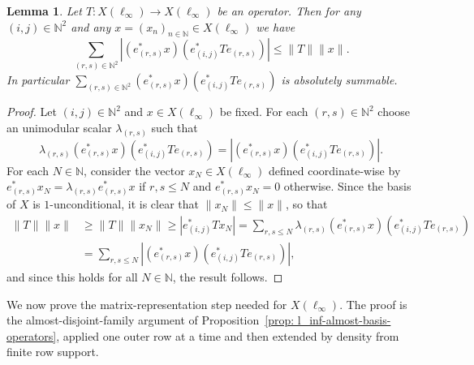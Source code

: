 \documentclass[11pt]{amsart}
\theoremstyle{plain}
\newtheorem{lemma}[theorem]{Lemma}
\theoremstyle{definition}
\numberwithin{equation}{section}
\newcommand{\norm}[1]{\lVert #1 \rVert}
\newcommand{\N}{\mathbb{N}}
\renewcommand{\leq}{\leqslant}
\renewcommand{\geq}{\geqslant}
\begin{document}
\begin{lemma}\label{lmm: preliminary-l-infty-iterated}
    Let $T \colon X(\ell_\infty) \to X(\ell_\infty)$ be an operator. Then for any $(i,j) \in \N^2$ and any $x = (x_n)_{n \in \N} \in X(\ell_\infty)$ we have
    \begin{equation*}
        \sum_{(r,s) \in \N^2} |(e^*_{(r,s)} x) (e^*_{(i,j)} T e_{(r,s)})| \leq \norm{T} \norm{x}.
    \end{equation*}
    In particular $\sum_{(r,s) \in \N^2} (e^*_{(r,s)} x) (e^*_{(i,j)} T e_{(r,s)})$ is absolutely summable.
\end{lemma}
\begin{proof}
    Let $(i,j) \in \N^2$ and $x \in X(\ell_\infty)$ be fixed. For each $(r,s) \in \N^2$ choose an unimodular scalar $\lambda_{(r,s)}$ such that
    \begin{equation*}
        \lambda_{(r,s)}(e^*_{(r,s)} x) (e^*_{(i,j)} T e_{(r,s)}) = |(e^*_{(r,s)} x) (e^*_{(i,j)} T e_{(r,s)})|. 
    \end{equation*}
    For each $N \in \N$, consider the vector $x_N \in X(\ell_\infty)$ defined coordinate-wise by $e_{(r,s)}^* x_N = \lambda_{(r,s)} e_{(r,s)}^* x$ if $r,s \leq N$ and $e_{(r,s)}^* x_N = 0$ otherwise. Since the basis of $X$ is $1$-unconditional, it is clear that $\norm{x_N} \leq \norm{x}$, so that
    \begin{align*}
        \norm{T} \norm{x} &\geq \norm{T} \norm{x_N} \geq |e^*_{(i,j)} T x_N| = \sum_{r,s \leq N}  \lambda_{(r,s)}(e^*_{(r,s)} x) (e^*_{(i,j)} T e_{(r,s)}) \\
        &= \sum_{r,s \leq N}  |(e^*_{(r,s)} x) (e^*_{(i,j)} T e_{(r,s)})|,
    \end{align*}
    and since this holds for all $N \in \N$, the result follows.
\end{proof}

We now prove the matrix-representation step needed for $X(\ell_\infty)$. The proof is the almost-disjoint-family argument of Proposition~\ref{prop: l_inf-almost-basis-operators}, applied one outer row at a time and then extended by density from finite row support.
\end{document}
